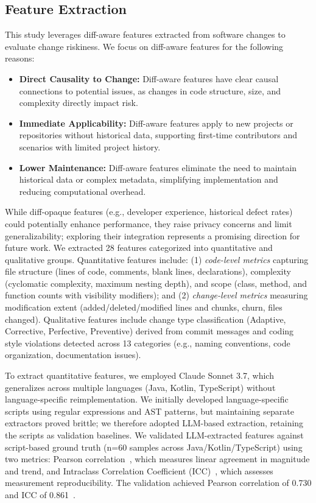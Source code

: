 \subsection{Feature Extraction}

This study leverages diff-aware features extracted from software changes to evaluate change riskiness. We focus on diff-aware features for the following reasons:

\begin{itemize}
\item \textbf{Direct Causality to Change:} Diff-aware features have clear causal connections to potential issues, as changes in code structure, size, and complexity directly impact risk.
\item \textbf{Immediate Applicability:} Diff-aware features apply to new projects or repositories without historical data, supporting first-time contributors and scenarios with limited project history.
\item \textbf{Lower Maintenance:} Diff-aware features eliminate the need to maintain historical data or complex metadata, simplifying implementation and reducing computational overhead.
\end{itemize}

While diff-opaque features (e.g., developer experience, historical defect rates) could potentially enhance performance, they raise privacy concerns and limit generalizability; exploring their integration represents a promising direction for future work. We extracted 28 features categorized into quantitative and qualitative groups. Quantitative features include: (1) \emph{code-level metrics} capturing file structure (lines of code, comments, blank lines, declarations), complexity (cyclomatic complexity, maximum nesting depth), and scope (class, method, and function counts with visibility modifiers); and (2) \emph{change-level metrics} measuring modification extent (added/deleted/modified lines and chunks, churn, files changed). Qualitative features include change type classification (Adaptive, Corrective, Perfective, Preventive) derived from commit messages and coding style violations detected across 13 categories (e.g., naming conventions, code organization, documentation issues).

%
%

To extract quantitative features, we employed Claude Sonnet 3.7, which generalizes across multiple languages (Java, Kotlin, TypeScript)
without language-specific reimplementation. We initially developed language-specific scripts using regular expressions and AST patterns, but maintaining separate extractors proved brittle; we therefore adopted LLM-based extraction, retaining the scripts as validation baselines. We validated LLM-extracted features against script-based ground truth (n=60 samples across Java/Kotlin/TypeScript) using two metrics: Pearson correlation~\cite{pearson1895}, which measures linear agreement in magnitude and trend, and Intraclass Correlation Coefficient (ICC)~\cite{shrout1979icc}, which assesses measurement reproducibility. The validation achieved Pearson correlation of 0.730 and ICC of 0.861~\cite{Li2023StaticAnalysisLLMs}.

